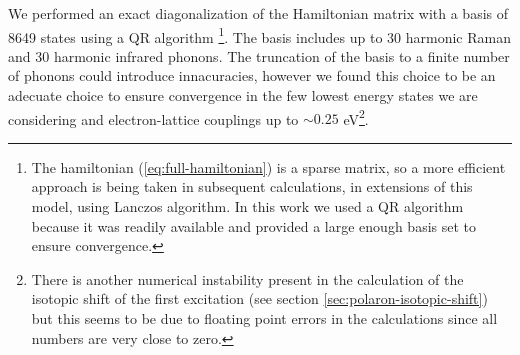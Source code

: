 We performed an exact diagonalization of the Hamiltonian matrix with a basis of 8649 states using a QR algorithm \cite{eigenweb}\footnote{The hamiltonian (\ref{eq:full-hamiltonian}) is a sparse matrix, so a more efficient approach is being taken in subsequent calculations, in extensions of this model, using Lanczos algorithm. In this work we used a QR algorithm because it was readily available and provided a large enough basis set to ensure convergence.}.
The basis includes up to 30 harmonic Raman and 30 harmonic infrared phonons. 
The  truncation of the basis to a finite number of phonons could introduce innacuracies, however we found this choice to be an adecuate choice to ensure convergence in the few lowest energy states we are considering and electron-lattice couplings up to $\sim0.25$ eV\footnote{There is another numerical instability present in the calculation of the isotopic shift of the first excitation (see section \ref{sec:polaron-isotopic-shift}) but this seems to be due to floating point errors in the calculations since all numbers are very close to zero.}.

